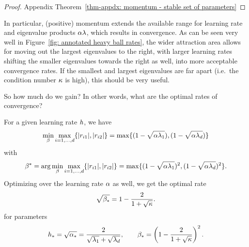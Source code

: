 \begin{proof}
	Appendix Theorem~\ref{thm-appdx: momentum - stable set of parameters}
\end{proof}

In particular, (positive) momentum extends the available range for
learning rate and eigenvalue products \(\alpha\lambda\), which results in
convergence. As can be seen very well in Figure~\ref{fig: annotated heavy
ball rates}, the wider attraction area allows for moving out the largest
eigenvalues to the right, with larger learning rates shifting the smaller
eigenvalues towards the right as well, into more acceptable convergence rates. If
the smallest and largest eigenvalues are far apart (i.e.\ the condition number
\(\kappa\) is high), this should be very useful.

So how much do we gain? In other words, what are the optimal rates of
convergence? 

\begin{lemma}
	\label{lem: optimal hb parameter selection}
	For a given learning rate \(h\), we have
	\begin{align*}
		\min_{\beta}\max_{i=1,\dots, d}\{|r_{i1}|,|r_{i2}|\}
		= \max\{(1-\sqrt{\alpha\lambda_1}), (1-\sqrt{\alpha\lambda_d})\}
	\end{align*}
	with 
	\begin{align*}
		\beta^*=\arg\min_{\beta}\max_{i=1,\dots,d}\{|r_{i1}|,|r_{i2}|\}
		= \max\{(1-\sqrt{\alpha\lambda_1})^2, (1-\sqrt{\alpha\lambda_d})^2\}.
	\end{align*}
	Optimizing over the learning rate \(\alpha\) as well, we get the optimal rate
	\begin{align*}
		\sqrt{\beta_*} = 1-\frac{2}{1+\sqrt{\kappa}}.
	\end{align*}
	for parameters
	\begin{align*}
		h_* = \sqrt{\alpha_*} = \frac{2}{\sqrt{\lambda_1}+\sqrt{\lambda_d}},
		\qquad
		\beta_*=\left(1-\frac{2}{1+\sqrt{\kappa}}\right)^2.
	\end{align*}
\end{lemma}

